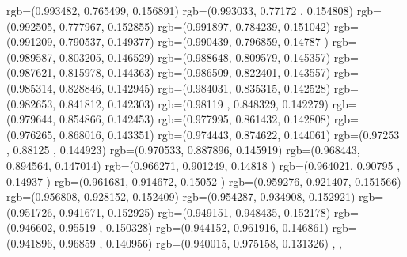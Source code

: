{{{      rgb=(0.993482,  0.765499,  0.156891)
      rgb=(0.993033,  0.77172 ,  0.154808)
      rgb=(0.992505,  0.777967,  0.152855)
      rgb=(0.991897,  0.784239,  0.151042)
      rgb=(0.991209,  0.790537,  0.149377)
      rgb=(0.990439,  0.796859,  0.14787 )
      rgb=(0.989587,  0.803205,  0.146529)
      rgb=(0.988648,  0.809579,  0.145357)
      rgb=(0.987621,  0.815978,  0.144363)
      rgb=(0.986509,  0.822401,  0.143557)
      rgb=(0.985314,  0.828846,  0.142945)
      rgb=(0.984031,  0.835315,  0.142528)
      rgb=(0.982653,  0.841812,  0.142303)
      rgb=(0.98119 ,  0.848329,  0.142279)
      rgb=(0.979644,  0.854866,  0.142453)
      rgb=(0.977995,  0.861432,  0.142808)
      rgb=(0.976265,  0.868016,  0.143351)
      rgb=(0.974443,  0.874622,  0.144061)
      rgb=(0.97253 ,  0.88125 ,  0.144923)
      rgb=(0.970533,  0.887896,  0.145919)
      rgb=(0.968443,  0.894564,  0.147014)
      rgb=(0.966271,  0.901249,  0.14818 )
      rgb=(0.964021,  0.90795 ,  0.14937 )
      rgb=(0.961681,  0.914672,  0.15052 )
      rgb=(0.959276,  0.921407,  0.151566)
      rgb=(0.956808,  0.928152,  0.152409)
      rgb=(0.954287,  0.934908,  0.152921)
      rgb=(0.951726,  0.941671,  0.152925)
      rgb=(0.949151,  0.948435,  0.152178)
      rgb=(0.946602,  0.95519 ,  0.150328)
      rgb=(0.944152,  0.961916,  0.146861)
      rgb=(0.941896,  0.96859 ,  0.140956)
      rgb=(0.940015,  0.975158,  0.131326)
		},
	},
}

\endinput
